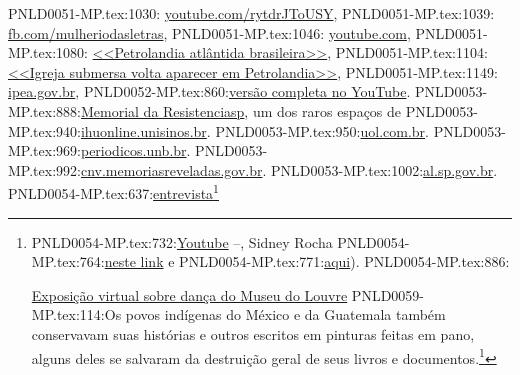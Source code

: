 {{{{{{{{PNLD0051-MP.tex:1030:    \href{https://www.youtube.com/watch?v=rytdrJToUSY\&feature=emb_logo}{youtube.com/rytdrJToUSY},
PNLD0051-MP.tex:1039:    \href{https://pt-br.facebook.com/mulheriodasletras/}{fb.com/mulheriodasletras},
PNLD0051-MP.tex:1046:    \href{https://www.youtube.com/channel/UCzOwcQ9fdT5GmD8IJR_21SA/videos}{youtube.com},
PNLD0051-MP.tex:1080:    \href{https://m.blogs.ne10.uol.com.br/mochileo/2019/04/01/petrolandia-atlantida-brasileira/}{<<Petrolandia atlântida brasileira>>},
PNLD0051-MP.tex:1104:    \href{http://g1.globo.com/pe/caruaru-regiao/noticia/2014/11/igreja-submersa-volta-aparecer-por-causa-da-estiagem-em-petrolandia.html}{<<Igreja submersa volta aparecer em Petrolandia>>},
PNLD0051-MP.tex:1149:    \href{https://www.ipea.gov.br/desafios/index.php?option=com_content\&view=article\&id=723:os-limites-da-transposicao-do-rio-sao-francisco\&catid=29:artigos-materias\&Itemid=34}{ipea.gov.br},
PNLD0052-MP.tex:860:\href{https://www.youtube.com/watch?v=XTIpAyXyvFA&t=3746s}{versão completa no YouTube}. 
PNLD0053-MP.tex:888:\href{http://memorialdaresistenciasp.org.br/acervo/}{Memorial da Resistenciasp}, um dos raros espaços de
PNLD0053-MP.tex:940:\href{http://www.ihuonline.unisinos.br/media/pdf/IHUOnlineEdicao358.pdf}{{ihuonline.unisinos.br}}.
PNLD0053-MP.tex:950:\href{https://noticias.uol.com.br/colunas/camilo-vannuchi/2020/07/03/com-julia-kucinski-se-consagra-como-genial-romancista-da-ditadura.htm}{{uol.com.br}}.
PNLD0053-MP.tex:969:\href{periodicos.unb.br/index.php/estudos/issue/view/1995}{periodicos.unb.br}.
PNLD0053-MP.tex:992:\href{http://cnv.memoriasreveladas.gov.br/}{{cnv.memoriasreveladas.gov.br}}.
PNLD0053-MP.tex:1002:\href{https://www.al.sp.gov.br/repositorio/bibliotecaDigital/20800_arquivo.pdf}{{al.sp.gov.br}}.
PNLD0054-MP.tex:637:\href{http://www.vacatussa.com/entrevista-sidney-rocha/}{entrevista}\footnote{
PNLD0054-MP.tex:732:\href{https://www.youtube.com/watch?v=wLNc8aGLM5Q&ab_channel=TVPernambuco}{Youtube} --, Sidney Rocha 
PNLD0054-MP.tex:764:\href{https://www.youtube.com/watch?v=hh8cUsdz1fU&ab_channel=AndresNeumann}{neste link} e 
PNLD0054-MP.tex:771:\href{https://www.youtube.com/watch?v=s6IR8lmGTxE&ab_channel=TheGetty}{aqui}). 
PNLD0054-MP.tex:886:\item \href{https://petitegalerie.louvre.fr/visite-virtuelle/saison2/}{Exposição virtual sobre dança do Museu do Louvre}
PNLD0059-MP.tex:114:Os povos indígenas do México e da Guatemala também conservavam suas histórias e outros escritos em pinturas feitas em pano, alguns deles se salvaram da destruição geral de seus livros e documentos.\footnote{A maior coleção de tecidos précolombianos do Brasil, cujas obras podem ser vistas nesse \href{https://masp.org.br/exposicoes/acervo-em-transformacao-comodato-masp-landmann-texteis-pre-colombianos}{link}, foi exposta no Museu de Arte Moderna de São Paulo-MASP, em 2019.}
}}}}}}}}}
